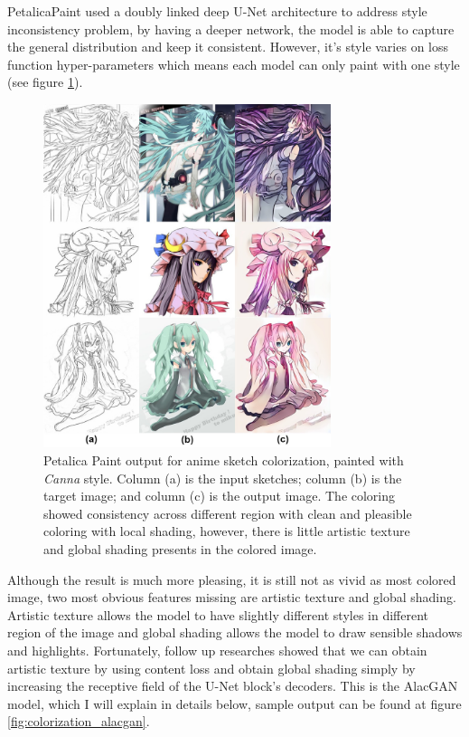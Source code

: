 PetalicaPaint\cite{PetalicaPaint} used a doubly linked deep U-Net architecture to address style inconsistency problem, by having a deeper network, the model is able to capture the general distribution and keep it consistent. However, it's style varies on loss function hyper-parameters which means each model can only paint with one style (see figure \ref{fig:colorization_petalica}).

\begin{figure}
    \centering
    \includegraphics[width=0.75\textwidth]{images/colorization/petalica.jpg}
    \caption{Petalica Paint output for anime sketch colorization, painted with \textit{Canna\protect\footnotemark}  style. Column (a) is the input sketches; column (b) is the target image; and column (c) is the output image.\cite{steinsDeepLearningProject2022} The coloring showed consistency across different region with clean and pleasible coloring with local shading, however, there is little artistic texture and global shading presents in the colored image.} 
    \label{fig:colorization_petalica}
\end{figure}


Although the result is much more pleasing, it is still not as vivid as most colored image, two most obvious features missing are artistic texture and global shading. Artistic texture allows the model to have slightly different styles in different region of the image and global shading allows the model to draw sensible shadows and highlights. Fortunately, follow up researches showed that we can obtain artistic texture by using content loss and obtain global shading simply by increasing the receptive field of the U-Net block's decoders\cite{ciUserGuidedDeepAnime2018}. This is the AlacGAN model, which I will explain in details below, sample output can be found at figure \ref{fig:colorization_alacgan}.

